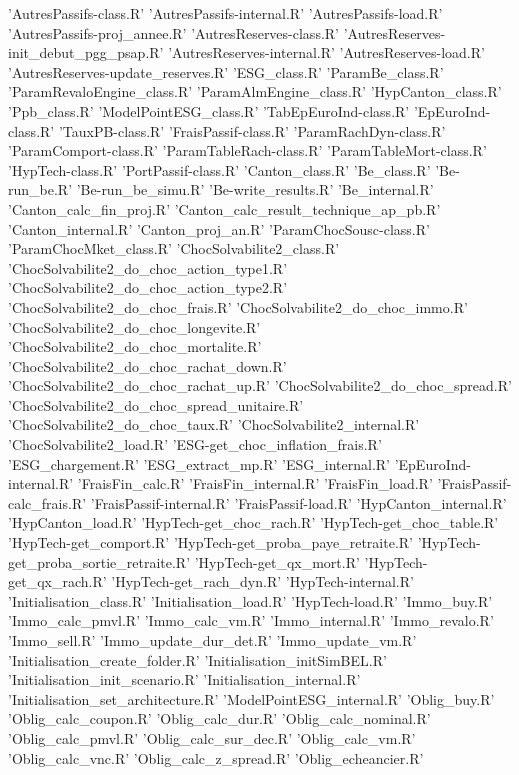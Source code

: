 \documentclass[a4paper]{book}
\begin{document}
\begin{description}
{'AutresPassifs-class.R' 'AutresPassifs-internal.R'
'AutresPassifs-load.R' 'AutresPassifs-proj\_annee.R'
'AutresReserves-class.R' 'AutresReserves-init\_debut\_pgg\_psap.R'
'AutresReserves-internal.R' 'AutresReserves-load.R'
'AutresReserves-update\_reserves.R' 'ESG\_class.R'
'ParamBe\_class.R' 'ParamRevaloEngine\_class.R'
'ParamAlmEngine\_class.R' 'HypCanton\_class.R' 'Ppb\_class.R'
'ModelPointESG\_class.R' 'TabEpEuroInd-class.R'
'EpEuroInd-class.R' 'TauxPB-class.R' 'FraisPassif-class.R'
'ParamRachDyn-class.R' 'ParamComport-class.R'
'ParamTableRach-class.R' 'ParamTableMort-class.R'
'HypTech-class.R' 'PortPassif-class.R' 'Canton\_class.R'
'Be\_class.R' 'Be-run\_be.R' 'Be-run\_be\_simu.R'
'Be-write\_results.R' 'Be\_internal.R' 'Canton\_calc\_fin\_proj.R'
'Canton\_calc\_result\_technique\_ap\_pb.R' 'Canton\_internal.R'
'Canton\_proj\_an.R' 'ParamChocSousc-class.R'
'ParamChocMket\_class.R' 'ChocSolvabilite2\_class.R'
'ChocSolvabilite2\_do\_choc\_action\_type1.R'
'ChocSolvabilite2\_do\_choc\_action\_type2.R'
'ChocSolvabilite2\_do\_choc\_frais.R'
'ChocSolvabilite2\_do\_choc\_immo.R'
'ChocSolvabilite2\_do\_choc\_longevite.R'
'ChocSolvabilite2\_do\_choc\_mortalite.R'
'ChocSolvabilite2\_do\_choc\_rachat\_down.R'
'ChocSolvabilite2\_do\_choc\_rachat\_up.R'
'ChocSolvabilite2\_do\_choc\_spread.R'
'ChocSolvabilite2\_do\_choc\_spread\_unitaire.R'
'ChocSolvabilite2\_do\_choc\_taux.R' 'ChocSolvabilite2\_internal.R'
'ChocSolvabilite2\_load.R' 'ESG-get\_choc\_inflation\_frais.R'
'ESG\_chargement.R' 'ESG\_extract\_mp.R' 'ESG\_internal.R'
'EpEuroInd-internal.R' 'FraisFin\_calc.R' 'FraisFin\_internal.R'
'FraisFin\_load.R' 'FraisPassif-calc\_frais.R'
'FraisPassif-internal.R' 'FraisPassif-load.R'
'HypCanton\_internal.R' 'HypCanton\_load.R'
'HypTech-get\_choc\_rach.R' 'HypTech-get\_choc\_table.R'
'HypTech-get\_comport.R' 'HypTech-get\_proba\_paye\_retraite.R'
'HypTech-get\_proba\_sortie\_retraite.R' 'HypTech-get\_qx\_mort.R'
'HypTech-get\_qx\_rach.R' 'HypTech-get\_rach\_dyn.R'
'HypTech-internal.R' 'Initialisation\_class.R'
'Initialisation\_load.R' 'HypTech-load.R' 'Immo\_buy.R'
'Immo\_calc\_pmvl.R' 'Immo\_calc\_vm.R' 'Immo\_internal.R'
'Immo\_revalo.R' 'Immo\_sell.R' 'Immo\_update\_dur\_det.R'
'Immo\_update\_vm.R' 'Initialisation\_create\_folder.R'
'Initialisation\_initSimBEL.R' 'Initialisation\_init\_scenario.R'
'Initialisation\_internal.R' 'Initialisation\_set\_architecture.R'
'ModelPointESG\_internal.R' 'Oblig\_buy.R' 'Oblig\_calc\_coupon.R'
'Oblig\_calc\_dur.R' 'Oblig\_calc\_nominal.R' 'Oblig\_calc\_pmvl.R'
'Oblig\_calc\_sur\_dec.R' 'Oblig\_calc\_vm.R' 'Oblig\_calc\_vnc.R'
'Oblig\_calc\_z\_spread.R' 'Oblig\_echeancier.R'
}
\end{description}
\end{document}

